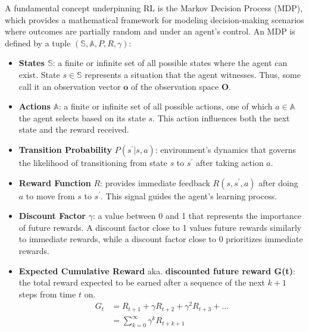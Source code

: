 \documentclass[../main.tex]{subfiles}
\begin{document}
A fundamental concept underpinning RL is the Markov Decision Process (MDP), which provides a mathematical framework for modeling decision-making scenarios where outcomes are partially random and under an agent's control. An MDP is defined by a tuple $(\mathbb{S}, \mathbb{A}, P, R, \gamma)$:
\begin{itemize}
    \item \textbf{States $\mathbb{S}$}: a finite or infinite set of all possible states where the agent can exist. State $s \in \mathbb{S}$ represents a situation that the agent witnesses. Thus, some call it an observation vector $\mathbf{o}$ of the observation space $\mathbf{O}$.
    \item \textbf{Actions $\mathbb{A}$}: a finite or infinite set of all possible actions, one of which $a \in \mathbb{A}$ the agent selects based on its state $s$. This action influences both the next state and the reward received.
    \item \textbf{Transition Probability} $P(s^\prime|s, a)$: environment's dynamics that governs the likelihood of transitioning from state $s$ to $s^\prime$ after taking action $a$.
    \item \textbf{Reward Function} $R$: provides immediate feedback $R(s, s^\prime, a)$ after doing $a$ to move from $s$ to $s^\prime$. This signal guides the agent's learning process.
    \item \textbf{Discount Factor} $\gamma$: a value between 0 and 1 that represents the importance of future rewards. A discount factor close to 1 values future rewards similarly to immediate rewards, while a discount factor close to 0 prioritizes immediate rewards.
    \item \textbf{Expected Cumulative Reward} aka. \textbf{discounted future reward G(t)}: the total reward expected to be earned after a sequence of the next $k+1$ steps from time $t$ on.
    \begin{equation}
        \begin{split}
            G_t &= R_{t+1} + \gamma R_{t+2} + \gamma^2 R_{t+3} + \ldots \\
            &= \sum_{k=0}^{\infty} \gamma^{k}R_{t+k+1}
        \end{split}
    \label{eq:future_rwd}
    \end{equation}
\end{itemize}
\end{document}
